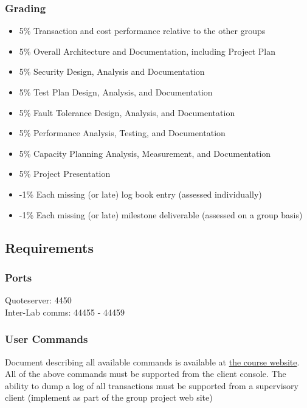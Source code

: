 \documentclass[a4paper,10pt]{article}
\begin{document}
\subsubsection{Grading}
\begin{itemize}
 \item 5\%	Transaction and cost performance relative to the other groups
 \item 5\%	Overall Architecture and Documentation, including Project Plan
 \item 5\%	Security Design, Analysis and Documentation
 \item 5\%	Test Plan Design, Analysis, and Documentation
 \item 5\%	Fault Tolerance Design, Analysis, and Documentation
 \item 5\%	Performance Analysis, Testing, and Documentation
 \item 5\%	Capacity Planning Analysis, Measurement, and Documentation
 \item 5\%	Project Presentation
 \item -1\%	Each missing (or late) log book entry  (assessed individually)
 \item -1\%	Each missing (or late) milestone deliverable (assessed on a group 
basis)
\end{itemize}

\subsection{Requirements}
\subsubsection{Ports}
Quoteserver: 4450\\
Inter-Lab comms: 44455 - 44459

\subsubsection{User Commands}

Document describing all available commands is available at 
\href{http://www.ece.uvic.ca/~seng462/ProjectWebSite/Commands.html}{the course 
website}. All of the above commands must be supported from the client console. 
The ability to dump a log of all transactions must be supported from a 
supervisory client (implement as part of the group project web site)
\end{document}
